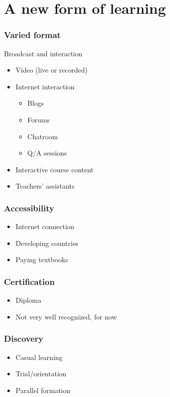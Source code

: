 \section{A new form of learning}
\setcounter{subsection}{1}
\begin{frame}
\frametitle{Varied format}
  Broadcast and interaction
  \begin{itemize}[<+->]
    \item Video (live or recorded)
    \item Internet interaction
      \begin{itemize}[<+->]
        \item Blogs
        \item Forums
        \item Chatroom
        \item Q/A sessions
      \end{itemize}
    \item Interactive course content
    \item Teachers' assistants
  \end{itemize}
\end{frame}

\begin{frame}
\frametitle{Accessibility}
  \begin{itemize}[<+->]
    \item Internet connection
    \item Developing countries
    \item Paying textbooks
  \end{itemize}
\end{frame}

\begin{frame}
\frametitle{Certification}
  \begin{itemize}[<+->]
    \item Diploma
    \item Not very well recognized, for now
  \end{itemize}
\end{frame}

\begin{frame}
\frametitle{Discovery}
  \begin{itemize}[<+->]
    \item Casual learning
    \item Trial/orientation
    \item Parallel formation
  \end{itemize}
\end{frame}
